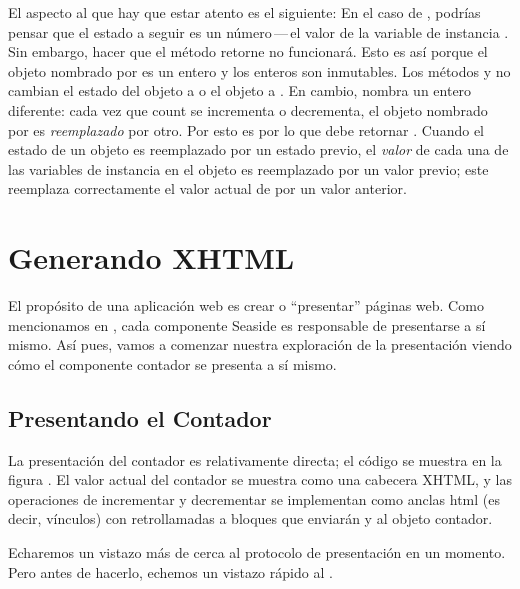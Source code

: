 \documentclass[a4paper,10pt,twoside]{book}
\begin{document}
El aspecto al que hay que estar atento es el siguiente:
En el caso de , podrías pensar que el estado a seguir es un número\,---\,el valor de la variable de instancia .
Sin embargo, hacer que el método  retorne  no funcionará.  
Esto es así porque el objeto nombrado por  es un entero y los enteros son inmutables.
Los métodos  y  no cambian el estado del objeto  a  o el objeto  a .
En cambio,  nombra un entero diferente: 
cada vez que count se incrementa o decrementa, el objeto nombrado por  es \emph{reemplazado} por otro.
Por esto es por lo que  debe retornar .
Cuando el estado de un objeto \mbox{} es reemplazado por un estado previo, el \emph{valor} de cada una de las variables de instancia en el objeto es reemplazado por un valor previo; este reemplaza correctamente el valor actual de  por un valor anterior. 

\section{Generando XHTML}

El propósito de una aplicación web es crear o ``presentar'' páginas web.  Como mencionamos en , cada componente Seaside es responsable de presentarse a sí mismo.  
Así pues, vamos a comenzar nuestra exploración de la presentación viendo cómo el componente contador se presenta a sí mismo.

\subsection{Presentando el Contador}

La presentación del contador es relativamente directa; el código se muestra en la figura .
El valor actual del contador se muestra como una cabecera XHTML, y las operaciones de incrementar y decrementar se implementan como anclas html (es decir, vínculos) con retrollamadas a bloques que enviarán  y  al objeto contador.

Echaremos un vistazo más de cerca al protocolo de presentación en un momento.
Pero antes de hacerlo, echemos un vistazo rápido al .
\end{document}
